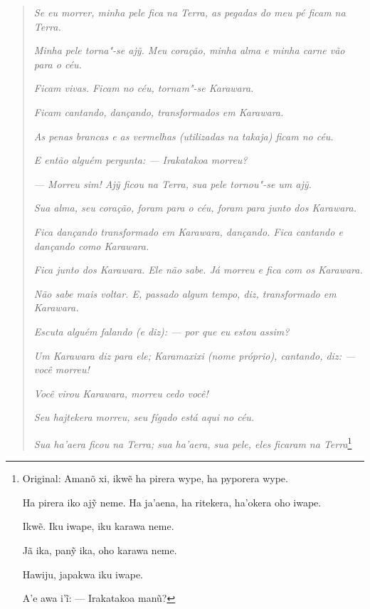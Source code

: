 \begin{quote}
\emph{Se eu morrer, minha pele fica na Terra, as pegadas do meu pé ficam na
Terra.}

\noindent\emph{Minha pele torna"-se \emph{ajỹ}. Meu coração, minha alma e minha carne
vão para o céu.}

\noindent\emph{Ficam vivas. Ficam no céu, tornam"-se \emph{Karawara}.}

\noindent\emph{Ficam cantando, dançando, transformados em \emph{Karawara}.}

\noindent\emph{As penas brancas e as vermelhas (utilizadas na \emph{takaja}) ficam no
céu.}

\noindent\emph{E então alguém pergunta: --- Irakatakoa morreu?}

\noindent\emph{--- Morreu sim! \emph{Ajỹ} ficou na Terra, sua pele tornou"-se um
\emph{ajỹ}.}

\noindent\emph{Sua alma, seu coração, foram para o céu, foram para junto dos \emph{Karawara}.}

\noindent\emph{Fica dançando transformado em \emph{Karawara}, dançando. Fica cantando e
dançando como \emph{Karawara}.}

\noindent\emph{Fica junto dos \emph{Karawara}. Ele não sabe. Já morreu e fica com os
\emph{Karawara}.}

\noindent\emph{Não sabe mais voltar. E, passado algum tempo, diz, transformado em
\emph{Karawara}.}

\noindent\emph{Escuta alguém falando (e diz): --- por que eu estou assim?}

\noindent\emph{Um \emph{Karawara} diz para ele; Karamaxixi (nome próprio), cantando,
diz: --- você morreu!}

\noindent\emph{Você virou \emph{Karawara}, morreu cedo você!}

\noindent\emph{Seu \emph{hajtekera} morreu, seu fígado está aqui no céu.}

\noindent\emph{Sua \emph{ha'aera} ficou na Terra; sua \emph{ha'aera}, sua pele, eles
ficaram na Terra}\footnote{Original: Amanõ xi, ikwẽ ha pirera wype, ha
  pyporera wype.

  Ha pirera iko ajỹ neme. Ha ja'aena, ha ritekera, ha'okera oho iwape.

  Ikwẽ. Iku iwape, iku karawa neme.

  Jã ika, panỹ ika, oho karawa neme.

  Hawiju, japakwa iku iwape.

  A'e awa i'ĩ: --- Irakatakoa manũ?

}
\end{quote}
